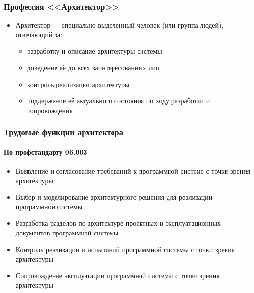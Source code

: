 \documentclass{../slides-style}
\begin{document}
    \begin{frame}
        \frametitle{Профессия <<Архитектор>>}
        \begin{itemize}
            \item Архитектор --- специально выделенный человек (или группа людей), отвечающий за:
            \begin{itemize}
                \item разработку и описание архитектуры системы
                \item доведение её до всех заинтересованных лиц
                \item контроль реализации архитектуры
                \item поддержание её актуального состояния по ходу разработки и сопровождения
            \end{itemize}
        \end{itemize}
    \end{frame}

    \begin{frame}
        \frametitle{Трудовые функции архитектора}
        \framesubtitle{По профстандарту 06.003}
        \begin{itemize}
            \item Выявление и согласование требований к программной системе с точки зрения архитектуры
            \item Выбор и моделирование архитектурного решения для реализации программной системы
            \item Разработка разделов по архитектуре проектных и эксплуатационных документов программной системы
            \item Контроль реализации и испытаний программной системы с точки зрения архитектуры
            \item Сопровождение эксплуатации программной системы с точки зрения архитектуры
        \end{itemize}
    \end{frame}
\end{document}
